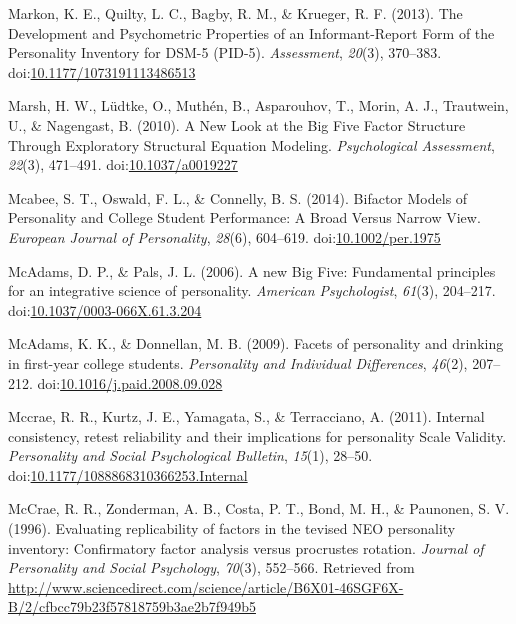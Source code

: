 \documentclass[,man,floatsintext]{apa6}
\theoremstyle{definition}
\theoremstyle{definition}
\theoremstyle{definition}
\theoremstyle{remark}
\begin{document}
\leavevmode\hypertarget{ref-Markon2013}{}%
Markon, K. E., Quilty, L. C., Bagby, R. M., \& Krueger, R. F. (2013).
The Development and Psychometric Properties of an Informant-Report Form
of the Personality Inventory for DSM-5 (PID-5). \emph{Assessment},
\emph{20}(3), 370--383.
doi:\href{https://doi.org/10.1177/1073191113486513}{10.1177/1073191113486513}

\leavevmode\hypertarget{ref-Marsh2010}{}%
Marsh, H. W., Lüdtke, O., Muthén, B., Asparouhov, T., Morin, A. J.,
Trautwein, U., \& Nagengast, B. (2010). A New Look at the Big Five
Factor Structure Through Exploratory Structural Equation Modeling.
\emph{Psychological Assessment}, \emph{22}(3), 471--491.
doi:\href{https://doi.org/10.1037/a0019227}{10.1037/a0019227}

\leavevmode\hypertarget{ref-Mcabee2014}{}%
Mcabee, S. T., Oswald, F. L., \& Connelly, B. S. (2014). Bifactor Models
of Personality and College Student Performance: A Broad Versus Narrow
View. \emph{European Journal of Personality}, \emph{28}(6), 604--619.
doi:\href{https://doi.org/10.1002/per.1975}{10.1002/per.1975}

\leavevmode\hypertarget{ref-McAdams2006a}{}%
McAdams, D. P., \& Pals, J. L. (2006). A new Big Five: Fundamental
principles for an integrative science of personality. \emph{American
Psychologist}, \emph{61}(3), 204--217.
doi:\href{https://doi.org/10.1037/0003-066X.61.3.204}{10.1037/0003-066X.61.3.204}

\leavevmode\hypertarget{ref-McAdams2009}{}%
McAdams, K. K., \& Donnellan, M. B. (2009). Facets of personality and
drinking in first-year college students. \emph{Personality and
Individual Differences}, \emph{46}(2), 207--212.
doi:\href{https://doi.org/10.1016/j.paid.2008.09.028}{10.1016/j.paid.2008.09.028}

\leavevmode\hypertarget{ref-Mccrae2011}{}%
Mccrae, R. R., Kurtz, J. E., Yamagata, S., \& Terracciano, A. (2011).
Internal consistency, retest reliability and their implications for
personality Scale Validity. \emph{Personality and Social Psychological
Bulletin}, \emph{15}(1), 28--50.
doi:\href{https://doi.org/10.1177/1088868310366253.Internal}{10.1177/1088868310366253.Internal}

\leavevmode\hypertarget{ref-McCrae1996}{}%
McCrae, R. R., Zonderman, A. B., Costa, P. T., Bond, M. H., \& Paunonen,
S. V. (1996). Evaluating replicability of factors in the tevised NEO
personality inventory: Confirmatory factor analysis versus procrustes
rotation. \emph{Journal of Personality and Social Psychology},
\emph{70}(3), 552--566. Retrieved from
\url{http://www.sciencedirect.com/science/article/B6X01-46SGF6X-B/2/cfbcc79b23f57818759b3ae2b7f949b5}
\end{document}
